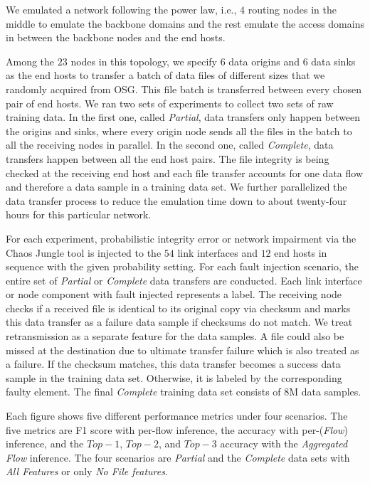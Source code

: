 We emulated a network following the power law, i.e., $4$ routing 
nodes in the middle to emulate the backbone domains and the rest emulate the access domains in between the backbone nodes and the end hosts. 

Among the $23$ nodes in this topology, we specify $6$ data origins and $6$ data sinks as the end hosts to transfer a batch of data files of different sizes that we randomly acquired from OSG. 
This file batch is transferred between every chosen pair of end hosts. We ran two sets of experiments to collect two sets of raw training data. In the first one, called {\it Partial},
data transfers only happen between the origins and sinks, where every origin node sends all the files in the batch 
to all the receiving nodes in parallel. In the second one, called {\it Complete}, data transfers happen between all the end host pairs. 
The file integrity is being checked at the receiving end host and each file transfer accounts for one data flow and therefore 
a data sample in a training data set. We further parallelized the data transfer process to reduce the emulation time down to about twenty-four hours for this particular network.  

For each experiment, probabilistic integrity error or network impairment via the Chaos Jungle tool is injected to the $54$ link interfaces and $12$ end hosts in sequence with the given probability setting.
For each fault injection scenario, the entire set of {\it Partial} or {\it Complete} data transfers are conducted. Each link interface or node component with fault injected represents a label.  
The receiving node checks if a received file is identical to its original copy via checksum and marks this data transfer as a failure data sample if checksums do not match. 
We treat retransmission as a separate feature for the data samples.  A file could also be missed at the destination due to ultimate transfer failure which is also treated as a failure. 
If the checksum matches, this data transfer becomes a success data sample in the training data set. Otherwise, it is labeled by the corresponding faulty element.
The final {\it Complete} training data set consists of 8{M} data samples.

Each figure shows five different performance metrics under four scenarios. The five metrics are F1 score with per-flow inference, the accuracy with per-({\it Flow}) inference, and the $Top-1$, $Top-2$, and $Top-3$ accuracy with
the {\it Aggregated Flow} inference. The four scenarios are {\it Partial} and the {\it Complete} data sets with {\it All Features} or only {\it No File features}.

